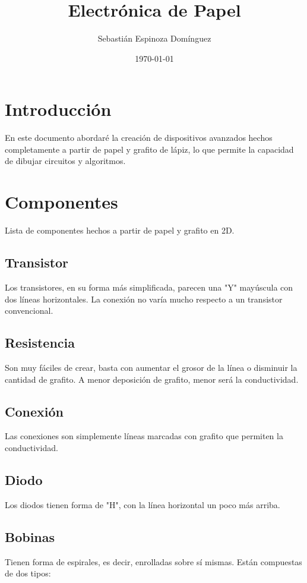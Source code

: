 \documentclass[]{article}
\title{Electrónica de Papel}
\author{Sebastián Espinoza Domínguez}
\date{\today}
\begin{document}
\maketitle

\section{Introducción}
En este documento abordaré la creación de dispositivos avanzados hechos completamente a partir de papel y grafito de lápiz,
 lo que permite la capacidad de dibujar circuitos y algoritmos.

\section{Componentes}
Lista de componentes hechos a partir de papel y grafito en 2D.

\subsection{Transistor}
Los transistores, en su forma más simplificada, parecen una "Y" mayúscula con dos líneas horizontales.
La conexión no varía mucho respecto a un transistor convencional.

\subsection{Resistencia}
Son muy fáciles de crear, basta con aumentar el grosor de la línea o disminuir la cantidad de grafito. A menor deposición
de grafito, menor será la conductividad.

\subsection{Conexión}
Las conexiones son simplemente líneas marcadas con grafito que permiten la conductividad.

\subsection{Diodo}
Los diodos tienen forma de "H", con la línea horizontal un poco más arriba.

\subsection{Bobinas}
Tienen forma de espirales, es decir, enrolladas sobre sí mismas. Están compuestas de dos tipos:
\end{document}
